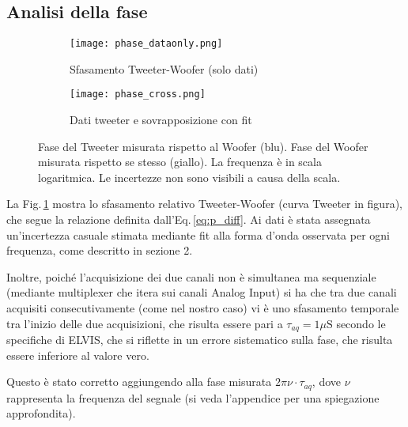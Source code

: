\documentclass[../Relazione_circuiti]{subfiles}
\begin{document}
\subsection{Analisi della fase}

  \begin{figure}[H]
    \centering

    \begin{subfigure}{=0.49\textwidth}
      \centering
      \texttt{[image: phase\_dataonly.png]}
      \caption{Sfasamento Tweeter-Woofer (solo dati)}
      \label{fig:pdiff_dataonly}

    \end{subfigure}
    \hfill
    \begin{subfigure}{=0.49\textwidth}
      \centering
      \texttt{[image: phase\_cross.png]}
      \caption{Dati tweeter e sovrapposizione con fit}
      \label{fig:pdiff_fit_data}

    \end{subfigure}

    \caption{
      Fase del Tweeter misurata rispetto al Woofer (blu). Fase del Woofer misurata rispetto se stesso (giallo).
      La frequenza è in scala logaritmica. Le incertezze non sono visibili a causa della scala.
    }
    \label{fig:phase_diff}

  \end{figure}

  La Fig.\,\ref{fig:pdiff_dataonly} mostra lo sfasamento relativo Tweeter-Woofer (curva Tweeter in figura), che segue la
  relazione definita dall'Eq.\,\eqref{eq:p_diff}.
  Ai dati è stata assegnata un'incertezza casuale stimata mediante fit alla forma d'onda osservata per ogni frequenza,
  come descritto in sezione 2.  
  
Inoltre, poiché l'acquisizione dei due canali non è simultanea ma sequenziale (mediante multiplexer che itera sui
  canali Analog Input) si ha che tra due canali acquisiti consecutivamente (come nel nostro caso) vi è uno sfasamento
  temporale tra l'inizio delle due acquisizioni, che risulta essere pari a $\tau_{aq}=1 \mu \mathrm{S}$
      secondo le specifiche di ELVIS, che si riflette in un errore sistematico sulla fase, che risulta essere inferiore
      al valore vero.

  Questo è stato corretto aggiungendo alla fase misurata $ 2 \pi \nu \cdot \tau_{aq}$, dove $\nu$
  rappresenta la frequenza del segnale (si veda l'appendice per una spiegazione approfondita).
\end{document}

